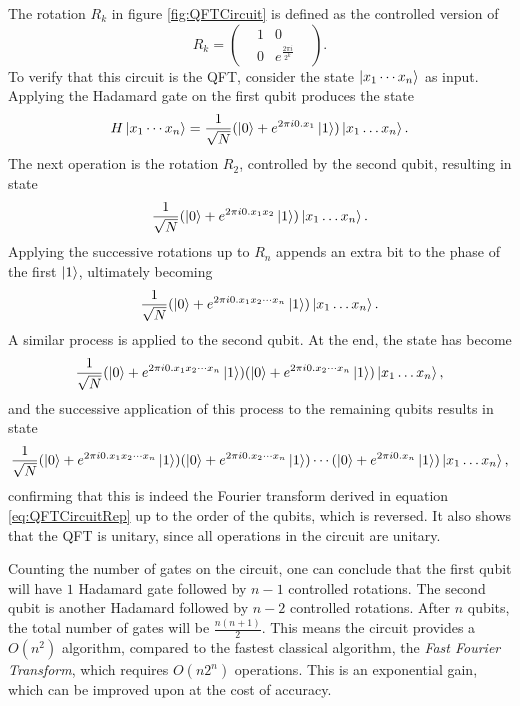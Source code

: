 \documentclass[../../../dissertation.tex]{subfiles}
\begin{document}
\par
The rotation $R_k$ in figure \ref{fig:QFTCircuit} is defined as the controlled version of 
\begin{equation}
	R_k = \begin{pmatrix}
		&1 & 0 & \\
		&0 & e^{\frac{2\pi i}{2^k}}
              \end{pmatrix}.
\end{equation}
To verify that this circuit is the QFT, consider the state $\ket{x_1\cdots x_n}$ as input. Applying the Hadamard gate on the first qubit produces the state
\begin{equation}
	H \ket{x_1 \cdots x_n} = \frac{1}{\sqrt{N}} ( \ket{0} + e^{2\pi i 0.x_1} \ket{1}) \ket{x_1\dots x_n}. 
\end{equation}
The next operation is the rotation $R_2$, controlled by the second qubit, resulting in state
\begin{equation}
	\frac{1}{\sqrt{N}} ( \ket{0} + e^{2\pi i 0.x_1x_2} \ket{1}) \ket{x_1\dots x_n}.
\end{equation}
Applying the successive rotations up to $R_n$ appends an extra bit to the phase of the first $\ket{1}$, ultimately becoming
\begin{equation}
	\frac{1}{\sqrt{N}} ( \ket{0} + e^{2\pi i 0.x_1x_2\cdots x_n} \ket{1}) \ket{x_1\dots x_n}.
\end{equation}
A similar process is applied to the second qubit. At the end, the state has become
\begin{equation}
	\frac{1}{\sqrt{N}} ( \ket{0} + e^{2\pi i 0.x_1x_2\cdots x_n} \ket{1})  ( \ket{0} + e^{2\pi i 0.x_2\cdots x_n} \ket{1})\ket{x_1\dots x_n},
\end{equation}
and the successive application of this process to the remaining qubits results in state
\begin{equation}
	\frac{1}{\sqrt{N}} ( \ket{0} + e^{2\pi i 0.x_1x_2\cdots x_n} \ket{1})  ( \ket{0} + e^{2\pi i 0.x_2\cdots x_n} \ket{1})\cdots ( \ket{0} + e^{2\pi i 0.x_n} \ket{1})\ket{x_1\dots x_n},
\end{equation}
confirming that this is indeed the Fourier transform derived in equation \eqref{eq:QFTCircuitRep} up to the order of the qubits, which is reversed. It also shows that the QFT is unitary, since all operations in the circuit are unitary.\par
Counting the number of gates on the circuit, one can conclude that the first qubit will have $1$ Hadamard gate followed by $n-1$ controlled rotations. The second qubit is another Hadamard followed by $n-2$ controlled rotations. After $n$ qubits, the total number of gates will be $\frac{n(n+1)}{2}$. This means the circuit provides a $O(n^2)$ algorithm, compared to the fastest classical algorithm, the \textit{Fast Fourier Transform}, which requires $O(n2^n)$ operations. This is an exponential gain, which can be improved upon at the cost of accuracy.
\end{document}
